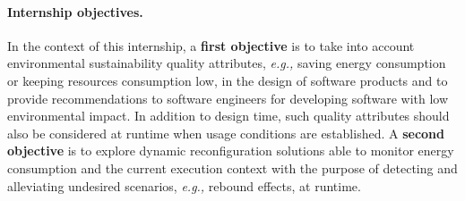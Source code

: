 \documentclass[a4paper,10pt]{article}
\newcommand{\eg}{\textit{e.g.,} }
\begin{document}
\paragraph{Internship objectives.}

In the context of this internship, a \textbf{first objective} is to take into account environmental sustainability quality attributes, \eg saving energy consumption or keeping resources consumption low, in the design of software products and to provide recommendations to software engineers for developing software with low environmental impact. In addition to design time, such quality attributes should also be considered at runtime when usage conditions are established.
A \textbf{second objective} is to explore dynamic reconfiguration solutions able to monitor energy consumption and the current execution context with the purpose of detecting and alleviating undesired scenarios, \eg rebound effects, at runtime.  
\end{document}
